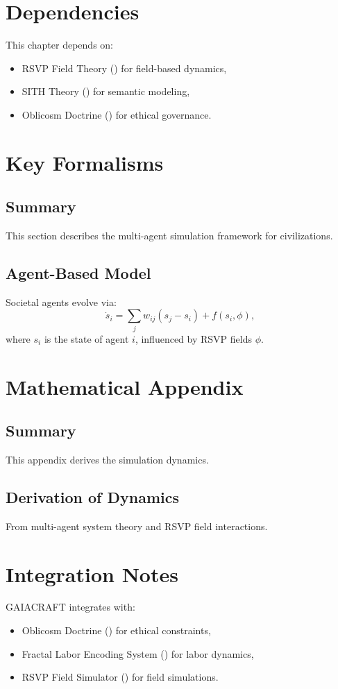\documentclass[11pt,oneside]{memoir}
\theoremstyle{plain}
\begin{document}
\section{Dependencies}
This chapter depends on:
\begin{itemize}
    \item RSVP Field Theory () for field-based dynamics,
    \item SITH Theory () for semantic modeling,
    \item Oblicosm Doctrine () for ethical governance.
\end{itemize}

\section{Key Formalisms}
\subsection{Summary}
This section describes the multi-agent simulation framework for civilizations.

\subsection{Agent-Based Model}
Societal agents evolve via:
\begin{equation}
    \dot{s}_i = \sum_{j} w_{ij} (s_j - s_i) + f(s_i, \phi),
\end{equation}
where \(s_i\) is the state of agent \(i\), influenced by RSVP fields \(\phi\).

\section{Mathematical Appendix}
\subsection{Summary}
This appendix derives the simulation dynamics.

\subsection{Derivation of Dynamics}
From multi-agent system theory and RSVP field interactions.

\section{Integration Notes}
GAIACRAFT integrates with:
\begin{itemize}
    \item Oblicosm Doctrine () for ethical constraints,
    \item Fractal Labor Encoding System () for labor dynamics,
    \item RSVP Field Simulator () for field simulations.
\end{itemize}
\end{document}
